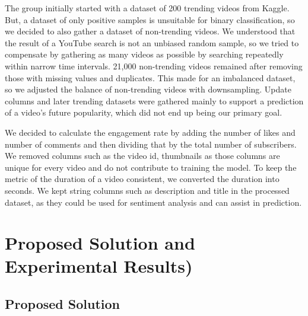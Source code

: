 \documentclass{article}
\begin{document}
\noindent
\quad The group initially started with a dataset of 200 trending videos from Kaggle. But, a dataset of only positive samples is unsuitable for binary classification, so we decided to also gather a dataset of non-trending videos. We understood that the result of a YouTube search is not an unbiased random sample, so we tried to compensate by gathering as many videos as possible by searching repeatedly within narrow time intervals. 21,000 non-trending videos remained after removing those with missing values and duplicates. This made for an imbalanced dataset, so we adjusted the balance of non-trending videos with downsampling. Update columns and later trending datasets were gathered mainly to support a prediction of a video’s future popularity, which did not end up being our primary goal.
\par We decided to calculate the engagement rate by adding the number of likes and number of comments and then dividing that by the total number of subscribers. We removed columns such as the video id, thumbnails as those columns are unique for every video and do not contribute to training the model. To keep the metric of the duration of a video consistent, we converted the duration into seconds. We kept string columns such as description and title in the processed dataset, as they could be used for sentiment analysis and can assist in prediction. 

\section*{Proposed Solution and Experimental Results)}
\subsection*{Proposed Solution}
\end{document}
